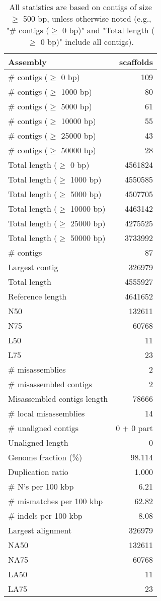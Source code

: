 \documentclass[12pt,a4paper]{article}
\begin{document}
\begin{table}[ht]
\begin{center}
\caption{All statistics are based on contigs of size $\geq$ 500 bp, unless otherwise noted (e.g., "\# contigs ($\geq$ 0 bp)" and "Total length ($\geq$ 0 bp)" include all contigs).}
\begin{tabular}{|l*{1}{|r}|}
\hline
Assembly & scaffolds \\ \hline
\# contigs ($\geq$ 0 bp) & 109 \\ \hline
\# contigs ($\geq$ 1000 bp) & 80 \\ \hline
\# contigs ($\geq$ 5000 bp) & 61 \\ \hline
\# contigs ($\geq$ 10000 bp) & 55 \\ \hline
\# contigs ($\geq$ 25000 bp) & 43 \\ \hline
\# contigs ($\geq$ 50000 bp) & 28 \\ \hline
Total length ($\geq$ 0 bp) & 4561824 \\ \hline
Total length ($\geq$ 1000 bp) & 4550585 \\ \hline
Total length ($\geq$ 5000 bp) & 4507705 \\ \hline
Total length ($\geq$ 10000 bp) & 4463142 \\ \hline
Total length ($\geq$ 25000 bp) & 4275525 \\ \hline
Total length ($\geq$ 50000 bp) & 3733992 \\ \hline
\# contigs & 87 \\ \hline
Largest contig & 326979 \\ \hline
Total length & 4555927 \\ \hline
Reference length & 4641652 \\ \hline
N50 & 132611 \\ \hline
N75 & 60768 \\ \hline
L50 & 11 \\ \hline
L75 & 23 \\ \hline
\# misassemblies & 2 \\ \hline
\# misassembled contigs & 2 \\ \hline
Misassembled contigs length & 78666 \\ \hline
\# local misassemblies & 14 \\ \hline
\# unaligned contigs & 0 + 0 part \\ \hline
Unaligned length & 0 \\ \hline
Genome fraction (\%) & 98.114 \\ \hline
Duplication ratio & 1.000 \\ \hline
\# N's per 100 kbp & 6.21 \\ \hline
\# mismatches per 100 kbp & 62.82 \\ \hline
\# indels per 100 kbp & 8.08 \\ \hline
Largest alignment & 326979 \\ \hline
NA50 & 132611 \\ \hline
NA75 & 60768 \\ \hline
LA50 & 11 \\ \hline
LA75 & 23 \\ \hline
\end{tabular}
\end{center}
\end{table}
\end{document}
